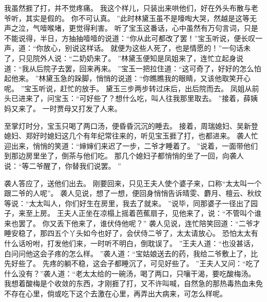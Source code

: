 我虽然捱了打，并不觉疼痛。
我这个样儿，只装出来哄他们，好在外头布散与老爷听，其实是假的。
你不可认真。
”此时林黛玉虽不是嚎啕大哭，然越是这等无声之泣，气噎喉堵，更觉得利害。
听了宝玉这番话，心中虽然有万句言词，只是不能说得，半日，方抽抽噎噎的说道：“你从此可都改了罢！”宝玉听说，便长叹一声，道：“你放心，别说这样话。
就便为这些人死了，也是情愿的！”一句话未了，只见院外人说：“二奶奶来了。
”林黛玉便知是凤姐来了，连忙立起身说道：“我从后院子去罢，回来再来。
”宝玉一把拉住道：“这可奇了，好好的怎么怕起他来。
”林黛玉急的跺脚，悄悄的说道：“你瞧瞧我的眼睛，又该他取笑开心呢。
”宝玉听说，赶忙的放手。
黛玉三步两步转过床后，出后院而去。
凤姐从前头已进来了，问宝玉：“可好些了？想什么吃，叫人往我那里取去。
”接着，薛姨妈又来了。
一时贾母又打发了人来。
\par
至掌灯时分，宝玉只喝了两口汤，便昏昏沉沉的睡去。
接着，周瑞媳妇、吴新登媳妇、郑好时媳妇这几个有年纪常往来的，听见宝玉捱了打，也都进来。
袭人忙迎出来，悄悄的笑道：“婶婶们来迟了一步，二爷才睡着了。
”说着，一面带他们到那边房里坐了，倒茶与他们吃。
那几个媳妇子都悄悄的坐了一回，向袭人说：“等二爷醒了，你替我们说罢。
”
\par
袭人答应了，送他们出去。
刚要回来，只见王夫人使个婆子来，口称“太太叫一个跟二爷的人呢”。
袭人见说，想了一想，便回身悄悄告诉晴雯、麝月、檀云、秋纹等说：“太太叫人，你们好生在房里，我去了就来。
”说毕，同那婆子一径出了园子，来至上房。
王夫人正坐在凉榻上摇着芭蕉扇子，见他来了，说：“不管叫个谁来也罢了。
你又丢下他来了，谁伏侍他呢？”
袭人见说，连忙陪笑回道：“二爷才睡安稳了，那四五个丫头如今也好了，会伏侍二爷了，太太请放心。
恐怕太太有什么话吩咐，打发他们来，一时听不明白，倒耽误了。
”王夫人道：“也没甚话，白问问他这会子疼的怎么样。
”袭人道：“宝姑娘送去的药，我给二爷敷上了，比先好些了。
先疼的躺不稳，这会子都睡沉了，可见好些了。
”王夫人又问：“吃了什么没有？”袭人道：“老太太给的一碗汤，喝了两口，只嚷干渴，要吃酸梅汤。
我想着酸梅是个收敛的东西，才刚捱了打，又不许叫喊，自然急的那热毒热血未免不存在心里，倘或吃下这个去激在心里，再弄出大病来，可怎么样呢。
